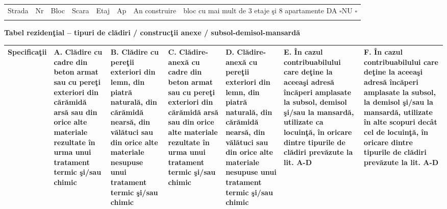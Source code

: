 \documentclass[10pt,a4paper,landscape]{article}
\newcommand{\fillline}[1][6cm]{\underline{\hspace{#1}}}
\newcommand{\checkboxempty}{$\square$}
\begin{document}
\begin{tabularx}{\textwidth}{|X|X|X|X|X|X|X|X|}
\hline
Strada & Nr & Bloc & Scara & Etaj & Ap & An construire & bloc cu mai mult de 3 etaje şi 8 apartamente DA \checkboxempty \quad NU \checkboxempty \\
\fillline[3cm] & \fillline[1cm] & \fillline[1cm] & \fillline[1cm] & \fillline[1cm] & \fillline[1cm] & \fillline[2cm] & \\
\hline
\end{tabularx}

\vspace{0.3cm}

\textbf{Tabel rezidenţial -- tipuri de clădiri / construcţii anexe / subsol-demisol-mansardă}

\renewcommand{\arraystretch}{1.3}
\begin{tabularx}{\textwidth}{|m{2.6cm}|X|X|X|X|X|X|}
\hline
\textbf{Specificaţii} & \textbf{A.} Clădire cu cadre din beton armat sau cu pereţi exteriori din cărămidă arsă sau din orice alte materiale rezultate în urma unui tratament termic şi/sau chimic & \textbf{B.} Clădire cu pereţii exteriori din lemn, din piatră naturală, din cărămidă nearsă, din vălătuci sau din orice alte materiale nesupuse unui tratament termic şi/sau chimic & \textbf{C.} Clădire-anexă cu cadre din beton armat sau cu pereţi exteriori din cărămidă arsă sau din orice alte materiale rezultate în urma unui tratament termic şi/sau chimic & \textbf{D.} Clădire-anexă cu pereţii exteriori din lemn, din piatră naturală, din cărămidă nearsă, din vălătuci sau din orice alte materiale nesupuse unui tratament termic şi/sau chimic & \textbf{E.} În cazul contribuabilului care deţine la aceeaşi adresă încăperi amplasate la subsol, demisol şi/sau la mansardă, utilizate ca locuinţă, în oricare dintre tipurile de clădiri prevăzute la lit. A-D & \textbf{F.} În cazul contribuabilului care deţine la aceeaşi adresă încăperi amplasate la subsol, la demisol şi/sau la mansardă, utilizate în alte scopuri decât cel de locuinţă, în oricare dintre tipurile de clădiri prevăzute la lit. A-D \\
\hline

\end{tabularx}
\end{document}
